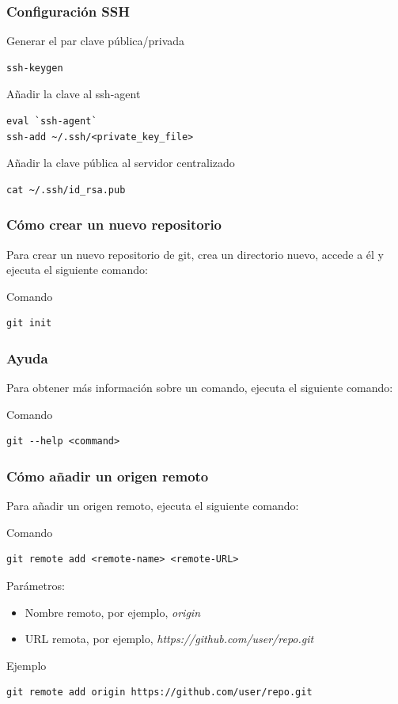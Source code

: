 \documentclass{beamer}
\begin{document}
\begin{frame}[fragile]
\frametitle{Configuración SSH}
\begin{block}{Generar el par clave pública/privada}
\begin{verbatim}
ssh-keygen
\end{verbatim}
\end{block}
\begin{block}{Añadir la clave al ssh-agent}
\begin{verbatim}
eval `ssh-agent`
ssh-add ~/.ssh/<private_key_file>
\end{verbatim}
\end{block}
\begin{block}{Añadir la clave pública al servidor centralizado}
\begin{verbatim}
cat ~/.ssh/id_rsa.pub
\end{verbatim}
\end{block}
\end{frame}

\begin{frame}[fragile]
\frametitle{Cómo crear un nuevo repositorio}
Para crear un nuevo repositorio de git, crea un directorio nuevo, accede a él y ejecuta el siguiente comando:
\begin{block}{Comando}
\begin{verbatim}
git init
\end{verbatim}
\end{block}
\end{frame}

\begin{frame}[fragile]
\frametitle{Ayuda}
Para obtener más información sobre un comando, ejecuta el siguiente comando:
\begin{block}{Comando}
\begin{verbatim}
git --help <command>
\end{verbatim}
\end{block}
\end{frame}

\begin{frame}[fragile]
\frametitle{Cómo añadir un origen remoto}
Para añadir un origen remoto, ejecuta el siguiente comando:
\begin{block}{Comando}
\begin{verbatim}
git remote add <remote-name> <remote-URL>
\end{verbatim}
\end{block}
\vskip 1.0cm
Parámetros:
\begin{itemize}
\item Nombre remoto, por ejemplo, \textit{origin}
\item URL remota, por ejemplo, \textit{https://github.com/user/repo.git}
\end{itemize}
\begin{block}{Ejemplo}
\begin{verbatim}
git remote add origin https://github.com/user/repo.git
\end{verbatim}
\end{block}
\end{frame}
\end{document}
